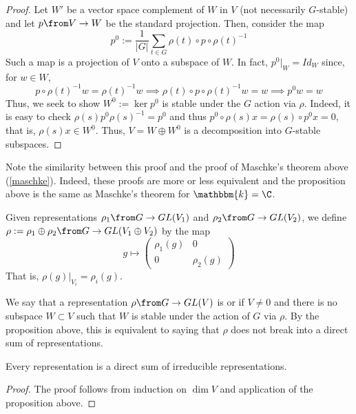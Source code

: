 \documentclass[11pt,leqno,oneside]{amsbook}
\newcommand{\bbk}{\mathbbm{k}}
\numberwithin{thm}{section}
\begin{document}
\begin{proof}
  Let \(W'\) be a vector space complement of \(W\) in \(V\) (not
  necessarily \(G\)-stable) and let \(p \from V \to W\) be the
  standard projection. Then, consider the map \[
    p^0 := \frac{1}{|G|} \sum_{t \in G} \rho(t) \circ p \circ \rho(t)^{-1}
  \]
  Such a map is a projection of \(V\) onto a subspace of \(W\). In
  fact, \(p^0|_W = Id_W\) since, for \(w \in W\), \[
    p \circ \rho(t)^{-1} w = \rho(t)^{-1} w \implies \rho(t) \circ p
    \circ \rho(t)^{-1} w = w \implies p^0 w = w
  \]
  Thus, we seek to show \(W^0 := \ker p^0\) is stable under the \(G\)
  action via \(\rho\). Indeed, it is easy to check \(\rho(s) p^0
  \rho(s)^{-1} = p^0\) and thus \(p^0 \circ \rho(s)x = \rho(s) \circ
  p^0 x = 0\), that is, \(\rho(s) x \in W^0\). Thus, \(V = W \oplus
  W^0\) is a decomposition into \(G\)-stable subspaces. 
\end{proof}
\begin{rmk}
  Note the similarity between this proof and the proof of Maschke's
  theorem above (\ref{maschke}). Indeed, these proofs are more or less
  equivalent and the proposition above is the same as Maschke's
  theorem for \(\bbk = \C\).
\end{rmk}
\begin{defn}
  Given representations \(\rho_1 \from G \to GL(V_1)\) and \(\rho_2 \from
  G \to GL(V_2)\), we define \(\rho := \rho_1 \oplus \rho_2 \from G \to GL(V_1
  \oplus V_2)\) by the map \[
    g \mapsto \left(
      \begin{array}{cc}
        \rho_1(g)&0\\
        0&\rho_2(g)
      \end{array}
    \right)
  \]
  That is, \(\rho(g)|_{V_i} = \rho_i(g)\).
\end{defn}
\begin{defn}
  We say that a representation \(\rho \from G \to GL(V)\) is
   or  if \(V \neq 0\) and there is no
  subspace \(W
  \subset V\) such that \(W\) is stable under the action of \(G\) via
  \(\rho\). By the proposition above, this is equivalent to saying
  that \(\rho\) does not break into a direct sum of representations.
\end{defn}
\begin{prop}
  Every representation is a direct sum of irreducible representations.
\end{prop}
\begin{proof}
  The proof follows from induction on \(\dim V\) and application of
  the proposition above.
\end{proof}
\end{document}

